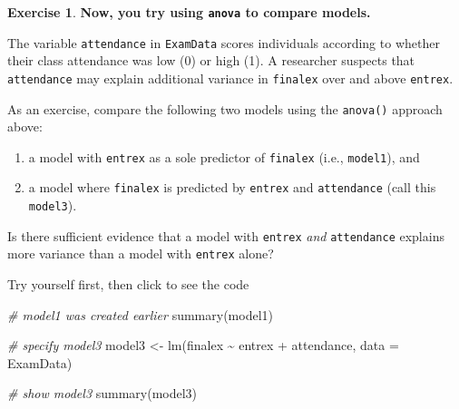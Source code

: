 \documentclass[
]{book}
\newenvironment{Shaded}{\begin{snugshade}}{\end{snugshade}}
\newcommand{\AttributeTok}[1]{\textcolor[rgb]{0.77,0.63,0.00}{#1}}
\newcommand{\CommentTok}[1]{\textcolor[rgb]{0.56,0.35,0.01}{\textit{#1}}}
\newcommand{\FunctionTok}[1]{\textcolor[rgb]{0.00,0.00,0.00}{#1}}
\newcommand{\NormalTok}[1]{#1}
\newcommand{\OtherTok}[1]{\textcolor[rgb]{0.56,0.35,0.01}{#1}}
\newcommand{\SpecialCharTok}[1]{\textcolor[rgb]{0.00,0.00,0.00}{#1}}
\theoremstyle{definition}
\theoremstyle{definition}
\theoremstyle{definition}
\newtheorem{exercise}{Exercise}[chapter]
\theoremstyle{definition}
\theoremstyle{remark}
\begin{document}
\begin{exercise}

\textbf{Now, you try using \texttt{anova} to compare models.}

The variable \texttt{attendance} in \texttt{ExamData} scores individuals according to whether their class attendance was low (0) or high (1). A researcher suspects that \texttt{attendance} may explain additional variance in \texttt{finalex} over and above \texttt{entrex}.

As an exercise, compare the following two models using the \texttt{anova()} approach above:

\begin{enumerate}
\def\labelenumi{\arabic{enumi}.}
\item
  a model with \texttt{entrex} as a sole predictor of \texttt{finalex} (i.e., \texttt{model1}), and
\item
  a model where \texttt{finalex} is predicted by \texttt{entrex} and \texttt{attendance} (call this \texttt{model3}).
\end{enumerate}

Is there sufficient evidence that a model with \texttt{entrex} \emph{and} \texttt{attendance} explains more variance than a model with \texttt{entrex} alone?

Try yourself first, then click to see the code

\begin{Shaded}
\begin{Highlighting}[]
\CommentTok{\# model1 was created earlier}
\FunctionTok{summary}\NormalTok{(model1)}

\CommentTok{\# specify model3}
\NormalTok{model3 }\OtherTok{\textless{}{-}} \FunctionTok{lm}\NormalTok{(finalex }\SpecialCharTok{\textasciitilde{}}\NormalTok{ entrex }\SpecialCharTok{+}\NormalTok{ attendance, }\AttributeTok{data =}\NormalTok{ ExamData)}

\CommentTok{\# show model3}
\FunctionTok{summary}\NormalTok{(model3)}


\end{Highlighting}
\end{Shaded}
\end{exercise}
\end{document}
